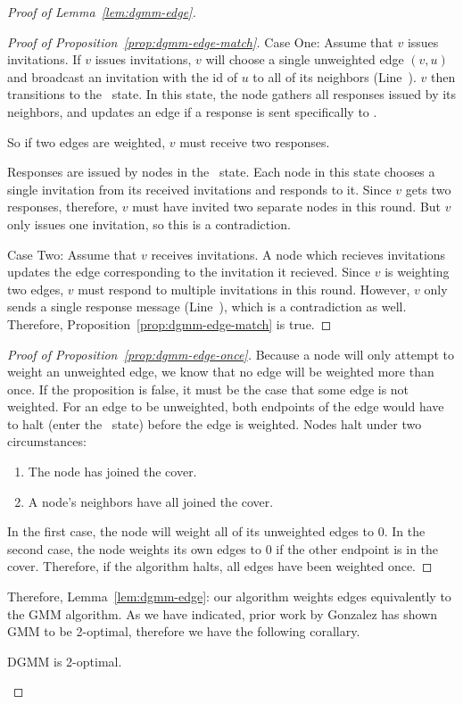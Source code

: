 \begin{proof}[Proof of Lemma~\ref{lem:dgmm-edge}]
\begin{proof}[Proof of Proposition~\ref{prop:dgmm-edge-match}]
    Case One: Assume that $v$ issues invitations. If $v$ issues invitations, $v$ will choose a single unweighted edge $(v,u)$ and broadcast an invitation with the id of $u$ to all of its neighbors (Line~). $v$ then transitions to the \cWd\ state. In this state, the node gathers all responses issued by its neighbors, and updates an edge if a response is sent specifically to .

    So if two edges are weighted, $v$ must receive two responses.

    Responses are issued by nodes in the \cRd\ state. Each node in this state chooses a single invitation from its received invitations and responds to it. Since $v$ gets two responses, therefore, $v$ must have invited two separate nodes in this round. But $v$ only issues one invitation, so this is a contradiction.

    Case Two: Assume that $v$ receives invitations. A node which recieves invitations updates the edge corresponding to the invitation it recieved. Since $v$ is weighting two edges, $v$ must respond to multiple invitations in this round. However, $v$ only sends a single response message (Line~), which is a contradiction as well.
    Therefore, Proposition~\ref{prop:dgmm-edge-match} is true.
  \end{proof}
  \begin{proof}[Proof of Proposition~\ref{prop:dgmm-edge-once}]
    Because a node will only attempt to weight an unweighted edge, we know that no edge will be weighted more than once. If the proposition is false, it must be the case that some edge is not weighted.
    For an edge to be unweighted, both endpoints of the edge would have to halt (enter the \cDd\ state) before the edge is weighted. Nodes halt under two circumstances:
    \begin{enumerate}
    \item The node has joined the cover.
    \item A node's neighbors have all joined the cover.
    \end{enumerate}
    In the first case, the node will weight all of its unweighted edges to 0. In the second case, the node weights its own edges to 0 if the other endpoint is in the cover.
    Therefore, if the algorithm halts, all edges have been weighted once.
  \end{proof}
  Therefore, Lemma~\ref{lem:dgmm-edge}: our algorithm weights edges equivalently to the GMM algorithm. As we have indicated, prior work by Gonzalez has shown GMM to be 2-optimal, therefore we have the following corallary.
\begin{cor}\label{cor:dgmm-two}DGMM is 2-optimal.\end{cor}
\end{proof}
